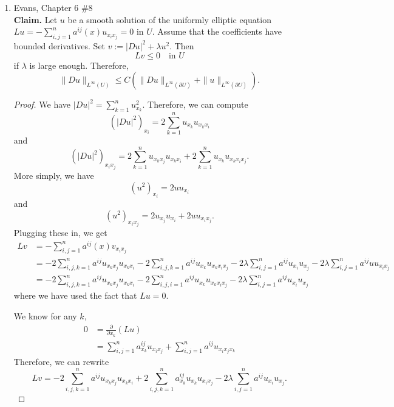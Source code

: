 \documentclass[a4paper]{article}
\newenvironment{claim}{\textbf{Claim.}}{}
\begin{document}
\begin{enumerate}
\begin{proof}
      Because we know $c(u) \in L^2$, we have
      \[ \|D_k^h Du \|_L^2(U)^2 \leq 2C \left( \|f\|_{L^2}^2 + \|c(u)\|_{L^2}^2 \right) .\]
      Because $c(u) \in L^2$, the right hand side is a finite constant, so by Theorem 3 in Section 5.8.2 of Evans, $Du \in H^1(U)$. Therefore, $u \in
      H^2(U)$, and $\|D^2 u\|_{L^2} \leq C' \|f\|_{L^2}$ for some constant $C'$.

    \end{proof}

  \item Evans, Chapter 6 \#8 \\
    \begin{claim}
      Let $u$ be a smooth solution of the uniformly elliptic equation $Lu = - \sum_{i,j=1}^n a^{ij}(x) u_{x_i x_j} = 0$ in $U$. Assume that the
      coefficients have bounded derivatives.
      Set $v := |Du|^2 + \lambda u^2$. Then
      \[ Lv \leq 0 \quad \text{in } U \]
      if $\lambda$ is large enough. Therefore,
      \[ \| Du \|_{L^\infty(U)} \leq C \left( \| Du \|_{L^\infty(\partial U)} + \| u \|_{L^\infty(\partial U)} \right). \]
    \end{claim}

    \begin{proof}
      We have $|Du|^2 = \sum_{k=1}^n u_{x_k}^2$. Therefore, we can compute
      \[ \left( |Du|^2 \right)_{x_i} = 2 \sum_{k=1}^n u_{x_k} u_{x_k x_i} \]
      and
      \[ \left( |Du|^2 \right)_{x_i x_j} = 2 \sum_{k=1}^n u_{x_k x_j} u_{x_k x_i} + 2 \sum_{k=1}^n u_{x_k} u_{x_k x_i x_j} .\]
      More simply, we have
      \[ (u^2)_{x_i} = 2 u u_{x_i} \]
      and
      \[ (u^2)_{x_i x_j} = 2 u_{x_j} u_{x_i} + 2 u u_{x_i x_j} .\]
      Plugging these in, we get
      \begin{align*}
        Lv &= - \sum_{i,j=1}^n a^{ij}(x) v_{x_i x_j} \\
        &= - 2 \sum_{i,j,k=1}^n a^{ij} u_{x_k x_j} u_{x_k x_i} - 2 \sum_{i,j,k=1}^n a^{ij} u_{x_k} u_{x_k x_i x_j} - 2 \lambda \sum_{i,j=1}^n a^{ij} u_{x_i} u_{x_j}
        - 2 \lambda \sum_{i,j=1}^n a^{ij} u u_{x_i x_j} \\
        &= - 2 \sum_{i,j,k=1}^n a^{ij} u_{x_k x_j} u_{x_k x_i} - 2 \sum_{i,j,i=1}^n a^{ij} u_{x_k} u_{x_k x_i x_j} - 2 \lambda \sum_{i,j=1}^n a^{ij} u_{x_i} u_{x_j}
      \end{align*}
      where we have used the fact that $Lu = 0$.

      We know for any $k$,
      \begin{align*}
        0 &= \frac{\partial}{\partial x_k} (Lu) \\
        &= \sum_{i,j=1}^n a^{ij}_{x_k} u_{x_i x_j} + \sum_{i,j=1}^n a^{ij} u_{x_i x_j x_k}
      \end{align*}
      Therefore, we can rewrite
      \[ Lv = -2 \sum_{i,j,k=1}^n a^{ij} u_{x_k x_j} u_{x_k x_i} + 2 \sum_{i,j,k=1}^n a^{ij}_{x_k} u_{x_k} u_{x_i x_j} - 2 \lambda \sum_{i,j=1}^n
      a^{ij} u_{x_i} u_{x_j} .\]


\end{proof}
\end{enumerate}
\end{document}
